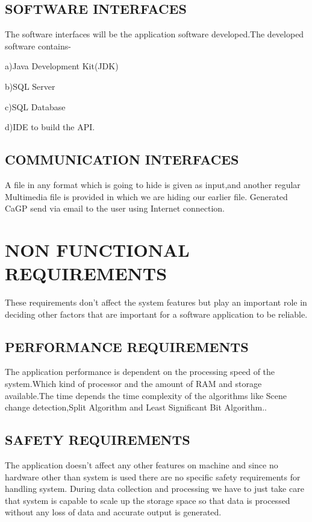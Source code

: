\documentclass[12pt]{extreport}
\begin{document}
    \subsection{SOFTWARE INTERFACES}
\hspace*{5em}The software interfaces will be the application software developed.The developed software contains-
        \par a)Java Development Kit(JDK)
        \par b)SQL Server
        \par c)SQL Database
        \par d)IDE to build the API.
    
    \subsection{COMMUNICATION INTERFACES}
\hspace*{5em}A file in any format which is going to hide is given as input,and another regular Multimedia file is provided in which we are hiding our earlier file. Generated CaGP send via email to the user using Internet connection. 
    

\section{NON FUNCTIONAL REQUIREMENTS}
\hspace*{5em}These requirements don't affect the system features but play an important role in deciding other factors that are important for a software application to be reliable.
     \subsection{PERFORMANCE REQUIREMENTS}
\hspace*{5em} The application performance is dependent on the processing speed of the system.Which kind of processor and the amount of RAM and storage available.The time depends the time complexity of the algorithms like Scene change detection,Split Algorithm and Least Significant Bit Algorithm..
     \subsection{SAFETY REQUIREMENTS}
\hspace*{5em}The application doesn't affect any other features on  machine and since no hardware other than system is used there are no specific safety requirements for handling system. During data collection and processing we have to just take care that system is capable to scale up the storage space so that data is processed without any loss of data and accurate output is generated.
\end{document}

